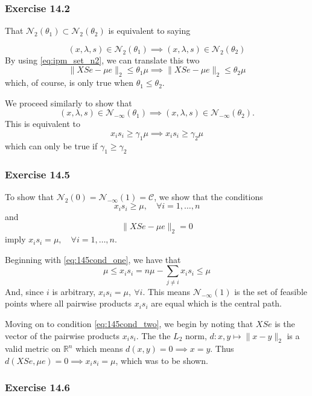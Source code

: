 \subsubsection{Exercise 14.2}

That $\mathcal{N}_2(\theta_1) \subset \mathcal{N}_2(\theta_2)$ is equivalent to saying

\[
    (x, \lambda, s) \in \mathcal{N}_2(\theta_1) \implies (x, \lambda, s) \in \mathcal{N}_2(\theta_2)
\]
By using \eqref{eq:ipm_set_n2}, we can translate this two
\[
    \| XSe - \mu e \|_2 \leq \theta_1 \mu \implies \| XSe - \mu e \|_2 \leq \theta_2 \mu
\]
which, of course, is only true when $\theta_1 \leq \theta_2$.

We proceed similarly to show that
\[
    (x, \lambda, s) \in \mathcal{N}_{-\infty}(\theta_1) \implies (x, \lambda, s) \in \mathcal{N}_{-\infty}(\theta_2).
\]
This is equivalent to
\[
    x_i s_i \geq \gamma_1 \mu \implies x_i s_i \geq \gamma_2 \mu
\]
which can only be true if $\gamma_1 \geq \gamma_2$

\subsubsection{Exercise 14.5}
To show that $\mathcal{N}_2(0) = \mathcal{N}_{-\infty}(1) = \mathcal{C}$, we show that the conditions
\begin{equation}
    x_i s_i \geq \mu, \quad \forall i = 1,\dots,n
    \label{eq:145cond_one}
\end{equation}
and
\begin{equation}
    \| XSe - \mu e \|_2 = 0
    \label{eq:145cond_two}
\end{equation}
imply $x_i s_i = \mu, \quad \forall i = 1,\dots,n$.

Beginning with \eqref{eq:145cond_one}, we have that
\[
    \mu \leq x_i s_i = n \mu - \sum_{j \neq i} x_i s_i \leq \mu
\]
And, since $i$ is arbitrary, $x_i s_i = \mu, \> \forall i$.
This means $\mathcal{N}_{-\infty}(1)$ is the set of feasible points where all pairwise products $x_i s_i$ are equal which is the central path.

Moving on to condition \eqref{eq:145cond_two}, we begin by noting that $XSe$ is the vector of the pairwise products $x_i s_i$.
The the $L_2$ norm, $d: x, y \mapsto \|x - y\|_2$ is a valid metric on $\mathbb{R}^n$ which means $d(x,y) = 0 \implies x = y$.
Thus $d(XSe, \mu e) = 0 \implies x_i s_i = \mu$, which was to be shown.
\subsubsection{Exercise 14.6}